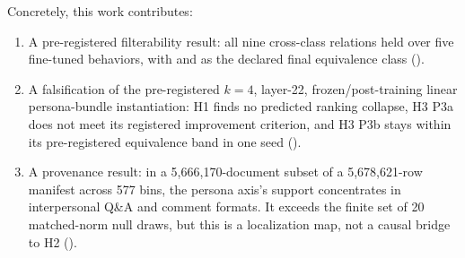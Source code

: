 Concretely, this work contributes:
\begin{enumerate}[leftmargin=2em, itemsep=2pt]
  \item A pre-registered filterability result: all nine cross-class
    relations held over five fine-tuned behaviors, with
     and  as the
    declared final equivalence class ().
  \item A falsification of the pre-registered $k=4$, layer-22,
    frozen/post-training linear persona-bundle instantiation: H1 finds no
    predicted ranking collapse, H3 P3a does not meet its registered
    improvement criterion, and H3 P3b stays within its pre-registered
    equivalence band in one seed ().
  \item A provenance result: in a 5,666,170-document subset of a
    5,678,621-row manifest across 577 bins, the persona axis's support
    concentrates in interpersonal Q\&A and comment formats. It exceeds the
    finite set of 20 matched-norm null draws, but this is a localization map,
    not a causal bridge to H2 ().
\end{enumerate}
